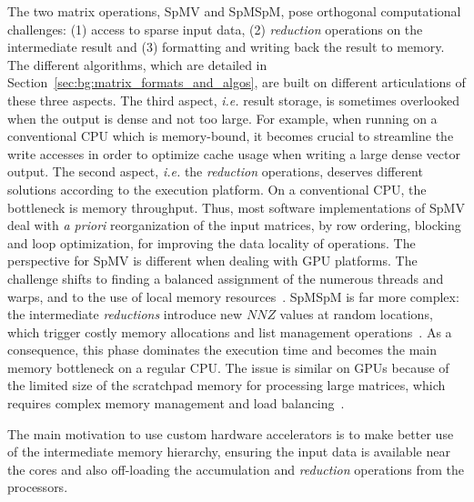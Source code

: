 The two matrix operations, SpMV and SpMSpM, pose orthogonal computational challenges: (1) access to sparse input data, (2) \emph{reduction} operations on the intermediate result and (3) formatting and writing back the result to memory.
The different algorithms, which are detailed in Section~\ref{sec:bg:matrix_formats_and_algos}, are built on different articulations of these three aspects.
The third aspect, \emph{i.e.} result storage, is sometimes overlooked when the output is dense and not too large.
For example, when running on a conventional CPU which is memory-bound, it becomes crucial to streamline the write accesses in order to optimize cache usage when writing a large dense vector output.
The second aspect, \emph{i.e.} the \emph{reduction} operations, deserves different solutions according to the execution platform.
On a conventional CPU, the bottleneck is memory throughput.
Thus, most software implementations of SpMV deal with \emph{a priori} reorganization of the input matrices, by row ordering, blocking and loop optimization, for improving the data locality of operations.
The perspective for SpMV is different when dealing with GPU platforms.
The challenge shifts to finding a balanced assignment of the numerous threads and warps, and to the use of local memory resources~\cite{Liu2014}.
SpMSpM is far more complex: the intermediate \emph{reductions} introduce new $NNZ$ values at random locations, which trigger costly memory allocations and list management operations~\cite{Gao2020}.
As a consequence, this phase dominates the execution time and becomes the main memory bottleneck on a regular CPU.
The issue is similar on GPUs because of the limited size of the scratchpad memory for processing large matrices, which requires complex memory management and load balancing~\cite{Zachariadis2020, Nagasaka2018, Deveci2018}.

%

The main motivation to use custom hardware accelerators is to make better use of the intermediate memory hierarchy, ensuring the input data is available near the cores and also off-loading the accumulation and \emph{reduction} operations from the processors.

